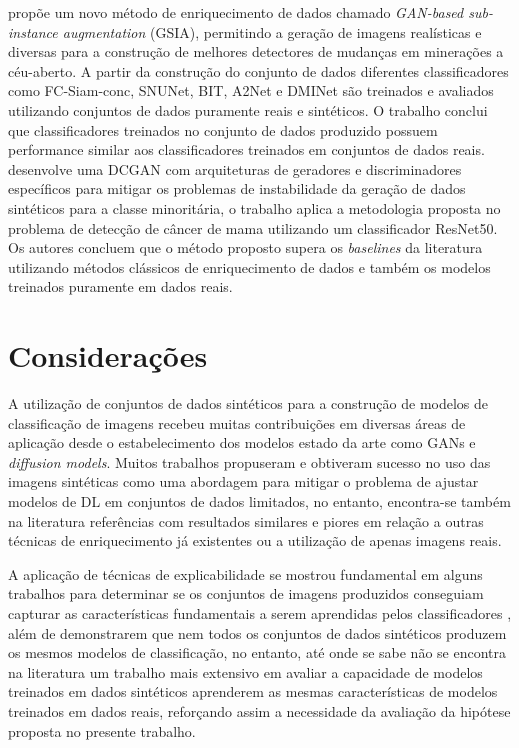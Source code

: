  propõe um novo método de enriquecimento de dados chamado \textit{GAN-based sub-instance augmentation} (GSIA), permitindo a geração de imagens realísticas e diversas para a construção de melhores detectores de mudanças em minerações a céu-aberto. A partir da construção do conjunto de dados diferentes classificadores como FC-Siam-conc, SNUNet, BIT, A2Net e DMINet são treinados e avaliados utilizando conjuntos de dados puramente reais e sintéticos. O trabalho conclui que classificadores treinados no conjunto de dados produzido possuem performance similar aos classificadores treinados em conjuntos de dados reais.
 desenvolve uma DCGAN com arquiteturas de geradores e discriminadores específicos para mitigar os problemas de instabilidade da geração de dados sintéticos para a classe minoritária, o trabalho aplica a metodologia proposta no problema de detecção de câncer de mama utilizando um classificador ResNet50. Os autores concluem que o método proposto supera os \textit{baselines} da literatura utilizando métodos clássicos de enriquecimento de dados e também os modelos treinados puramente em dados reais.

\section{Considerações} \label{RevConsideracoes}

A utilização de conjuntos de dados sintéticos para a construção de modelos de classificação de imagens recebeu muitas contribuições em diversas áreas de aplicação desde o estabelecimento dos modelos estado da arte como GANs e \textit{diffusion models}.
Muitos trabalhos propuseram e obtiveram sucesso no uso das imagens sintéticas como uma abordagem para mitigar o problema de ajustar modelos de DL em conjuntos de dados limitados, no entanto, encontra-se também na literatura referências com resultados similares \cite{xieGANBasedSubInstanceAugmentation2024} e piores \cite{ivanovsSyntheticImageGeneration2023}\cite{deptoQuantifyingImbalancedClassification2023a} \cite{masengiInvestigatingDeepLearning2023} em relação a outras técnicas de enriquecimento já existentes ou a utilização de apenas imagens reais.

A aplicação de técnicas de explicabilidade se mostrou fundamental em alguns trabalhos para determinar se os conjuntos de imagens produzidos conseguiam capturar as características fundamentais a serem aprendidas pelos classificadores \cite{youngchoiAutomatedDetectionCrystalline2023a} \cite{baoRareHeartTransplant2023} \cite{giusteExplainableSyntheticImage2023a} \cite{deptoQuantifyingImbalancedClassification2023a} \cite{ivanovsSyntheticImageGeneration2023}, além de demonstrarem que nem todos os conjuntos de dados sintéticos produzem os mesmos modelos de classificação, no entanto, até onde se sabe não se encontra na literatura um trabalho mais extensivo em avaliar a capacidade de modelos treinados em dados sintéticos aprenderem as mesmas características de modelos treinados em dados reais, reforçando assim a necessidade da avaliação da hipótese proposta no presente trabalho.
